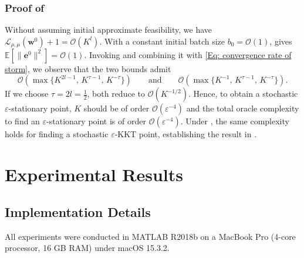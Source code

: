 \documentclass{article}
\theoremstyle{plain}
\theoremstyle{definition}
\theoremstyle{remark}
\newcommand{\EE}{\mathbb{E}}
\newcommand{\be}{\bm{e}}
\newcommand{\calL}{\mathcal{L}}
\newcommand{\calO}{\mathcal{O}}
\newcommand{\bw}{\bm{w}}
\numberwithin{equation}{section}
\begin{document}
\subsubsection{Proof of }
\label{app:storm_without_initial_feasibility}
Without assuming initial approximate feasibility, we have $\calL_{\rho,\mu}(\bw^0)+1 = \calO(K^{l})$. With a constant initial batch size $b_0=\calO(1)$,  gives $\EE[\|\be^0\|^2]=\calO(1)$. Invoking  and combining it with \eqref{Eq: convergence rate of storm}, we observe that the two bounds admit
\[
    \calO\!\left(\max\{K^{2l-1},\,K^{\tau-1},\,K^{-\tau}\}\right)
    \qquad\text{and}\qquad
    \calO\!\left(\max\{K^{-1},\,K^{\tau-1},\,K^{-\tau}\}\right).
\]
If we choose $\tau=2l=\tfrac{1}{2}$, both reduce to $\calO(K^{-1/2})$. Hence, to obtain a stochastic $\varepsilon$-stationary point, $K$ should be of order $\calO(\varepsilon^{-4})$ and the total oracle complexity to find an $\varepsilon$-stationary point is of order $\calO(\varepsilon^{-4})$. Under , the same complexity holds for finding a stochastic $\varepsilon$-KKT point, establishing the result in .


\section{Experimental Results}
\label{appendix:complete experiment results}
\subsection{Implementation Details}
\label{app:implementation_details}
All experiments were conducted in MATLAB R2018b on a MacBook Pro (4-core processor, 16 GB RAM) under macOS 15.3.2.
\end{document}
